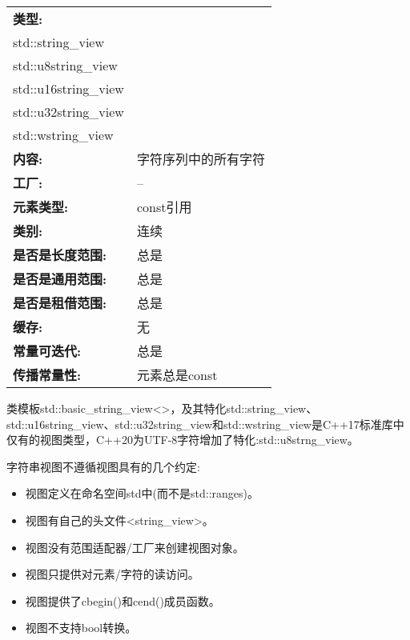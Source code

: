 \begin{longtable}[c]{|l|l|}
\hline
\textbf{类型:} &
\begin{tabular}[c]{@{}l@{}}std::basic\_string\_view\textless{}\textgreater\\ std::string\_view\\ std::u8string\_view\\ std::u16string\_view\\ std::u32string\_view\\ std::wstring\_view\end{tabular} \\ \hline
\endfirsthead
%
\endhead
%
\textbf{内容:}              & 字符序列中的所有字符 \\ \hline
\textbf{工厂:}              & --                                     \\ \hline
\textbf{元素类型:}         & const引用                       \\ \hline
\textbf{类别:}             & 连续                             \\ \hline
\textbf{是否是长度范围:}       & 总是                                 \\ \hline
\textbf{是否是通用范围:}      & 总是                                 \\ \hline
\textbf{是否是租借范围:}    & 总是                                 \\ \hline
\textbf{缓存:}               & 无                                \\ \hline
\textbf{常量可迭代:}       & 总是                                 \\ \hline
\textbf{传播常量性:} & 元素总是const              \\ \hline
\end{longtable}

类模板std::basic\_string\_view<>，及其特化std::string\_view、std::u16string\_view、std::u32string\_view和std::wstring\_view是C++17标准库中仅有的视图类型，C++20为UTF-8字符增加了特化:std::u8strng\_view。

字符串视图不遵循视图具有的几个约定:

\begin{itemize}
\item
视图定义在命名空间std中(而不是std::ranges)。

\item
视图有自己的头文件<string\_view>。

\item
视图没有范围适配器/工厂来创建视图对象。

\item
视图只提供对元素/字符的读访问。

\item
视图提供了cbegin()和cend()成员函数。

\item
视图不支持bool转换。
\end{itemize}

